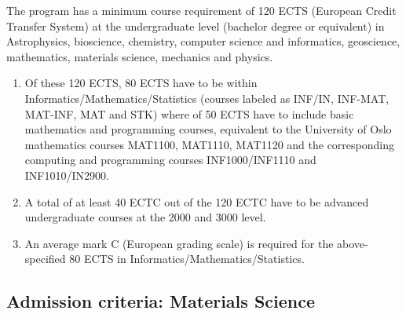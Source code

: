 \documentclass[%
oneside,                 %
final,                   %
10pt]{article}
\begin{document}
The program has a minimum course requirement of 120 ECTS (European Credit Transfer System) at the undergraduate level (bachelor degree or equivalent) in Astrophysics, bioscience, chemistry, computer science and informatics, geoscience, mathematics, materials science, mechanics and physics. 
\begin{enumerate}
\item Of these 120 ECTS, 80 ECTS have to be within Informatics/Mathematics/Statistics (courses labeled as INF/IN, INF-MAT, MAT-INF, MAT and STK) where of 50 ECTS have to include basic mathematics and programming courses, equivalent to the University of Oslo mathematics courses MAT1100, MAT1110, MAT1120 and the corresponding computing and programming courses INF1000/INF1110 and INF1010/IN2900. 

\item A total of at least 40 ECTC out of the 120 ECTC have to be advanced undergraduate courses at the 2000 and 3000 level.

\item An average mark C (European grading scale) is required for the above-specified 80 ECTS in Informatics/Mathematics/Statistics.
\end{enumerate}

\noindent
\subsection*{Admission criteria: Materials Science}
\end{document}
